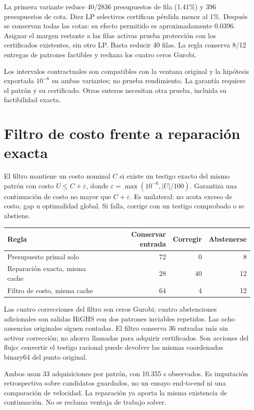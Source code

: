 \documentclass[10pt,a4paper]{article}
\begin{document}
La primera variante reduce 40/2836 presupuestos de fila (1.41\%) y 396
presupuestos de cota. Diez LP selectivos certifican pérdida menor al 1\%.
Después se conservan todas las cotas: su efecto permitido es aproximadamente 0.0396.
Asignar el margen restante a las filas activas prueba protección con los
certificados existentes, sin otro LP. Basta reducir 40 filas. La regla
conserva 8/12 entregas de patrones factibles y rechaza los cuatro ceros Gurobi.

Los intervalos contractuales son compatibles con la ventana original y la
hipótesis exportada $10^{-6}$ en ambas variantes; no prueba rendimiento.
La garantía requiere el patrón y su certificado. Otros enteros necesitan
otra prueba, incluida su factibilidad exacta.
\newpage
\section*{Filtro de costo frente a reparación exacta}
El filtro mantiene un costo nominal $C$ si existe un testigo exacto del mismo
patrón con costo $U\le C+\varepsilon$, donde
$\varepsilon=\max(10^{-6},|U|/100)$. Garantiza una continuación de costo
no mayor que $C+\varepsilon$. Es unilateral: no acota exceso de costo,
gap u optimalidad global. Si falla, corrige con un testigo comprobado o se abstiene.
\begin{center}\begin{tabular}{@{}lrrr@{}}\toprule
Regla & Conservar entrada & Corregir & Abstenerse\\\midrule
Presupuesto primal solo &72&0&8\\
Reparación exacta, misma cache &28&40&12\\
Filtro de costo, misma cache &64&4&12\\\bottomrule\end{tabular}\end{center}
Las cuatro correcciones del filtro son ceros Gurobi; cuatro abstenciones
adicionales son salidas HiGHS con dos patrones inviables repetidos. Las ocho
ausencias originales siguen contadas. El filtro conserva 36 entradas más
sin activar corrección; no ahorra llamadas para adquirir certificados.
Son acciones del flujo: convertir el testigo racional puede devolver las
mismas coordenadas binary64 del punto original.

Ambos usan 33 adquisiciones por patrón, con 10.355 s
observados. Es imputación retrospectiva sobre candidatos guardados, no un
ensayo end-to-end ni una comparación de velocidad. La reparación ya aporta
la misma existencia de continuación. No se reclama ventaja de trabajo solver.
\end{document}
